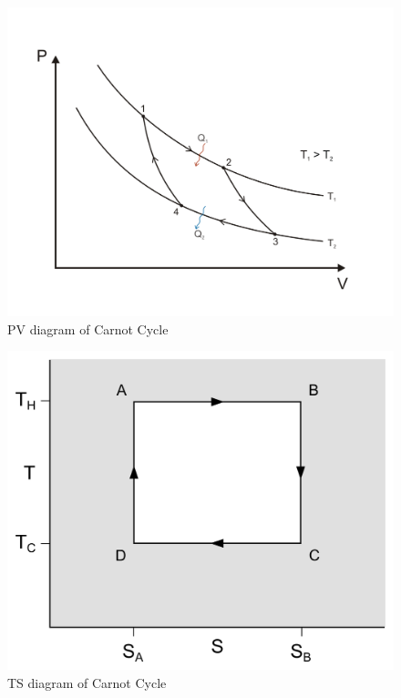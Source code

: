 \begin{figure}[!htbp]
	\begin{center}
		\includegraphics[scale=0.3]{diagrams/CarnotPV.png}
	\end{center}
	\caption{PV diagram of Carnot Cycle}\label{fig10:carnotpv}
\end{figure}
\begin{figure}[!htbp]
	\begin{center}
		\includegraphics[scale=0.3]{diagrams/CarnotTS.png}
	\end{center}
	\caption{TS diagram of Carnot Cycle}\label{fig10:carnotts}
\end{figure}

